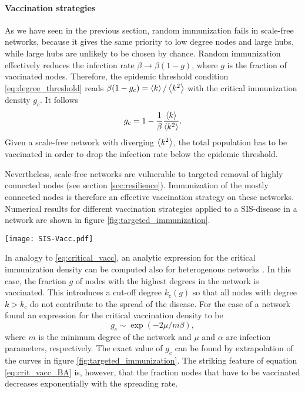 \documentclass[openright,twoside,headsepline]{scrbook}
\begin{document}
\paragraph{Vaccination strategies\color{Cayenne}{.}}
As we have seen in the previous section, random immunization fails in scale-free networks, because it gives the same priority to low degree nodes and large hubs, while large hubs are unlikely to be chosen by chance.
Random immunization effectively reduces the infection rate $\beta \rightarrow \beta (1-g)$, where $g$ is the fraction of vaccinated nodes.
Therefore, the epidemic threshold condition \eqref{eq:degree_threshold} reads $\beta (1-g_c)=\left< k \right>/\left< k^2 \right>$ with the critical immunization density $g_c$.
It follows
\begin{equation}\label{eq:critical_vacc}
g_c=1- \frac{1}{\beta } \frac{\left< k \right>}{\left< k^2 \right>}.
\end{equation}
Given a scale-free network with diverging $\left< k^2 \right>$, the total population has to be vaccinated in order to drop the infection rate below the epidemic threshold.

Nevertheless, scale-free networks are vulnerable to targeted removal of highly connected nodes (see section \ref{sec:resilience}).
Immunization of the mostly connected nodes is therefore an effective vaccination strategy on these networks.
Numerical results for different vaccination strategies applied to a SIS-disease in a \BA network are shown in figure \ref{fig:targeted_immunization}.
%
\begin{SCfigure}
\texttt{[image: SIS-Vacc.pdf]}
\caption{Targeted and random vaccination for an SIS disease in a \BA network with $10^5$ nodes and $m=4$.
Infection parameters $\beta / \mu =2$.}
\label{fig:targeted_immunization}
\end{SCfigure}
%

In analogy to \eqref{eq:critical_vacc}, an analytic expression for the critical immunization density can be computed also for heterogenous networks \citep{PastorSat:immunization}.
In this case, the fraction $g$ of nodes with the highest degrees in the network is vaccinated.
This introduces a cut-off degree $k_c(g)$ so that all nodes with degree $k>k_c$ do not contribute to the spread of the disease.
For the case of a \BA network \citeauthor{PastorSat:immunization} found an expression for the critical vaccination density to be
\begin{equation}\label{eq:crit_vacc_BA}
g_c \sim \exp (-2\mu / m\beta ),
\end{equation}
where $m$ is the minimum degree of the network and $\mu $ and $\alpha $ are infection parameters, respectively.
The exact value of $g_c$ can be found by extrapolation of the curves in figure \ref{fig:targeted_immunization}.
The striking feature of equation \eqref{eq:crit_vacc_BA} is, however, that the fraction nodes that have to be vaccinated decreases exponentially with the spreading rate.
\end{document}
